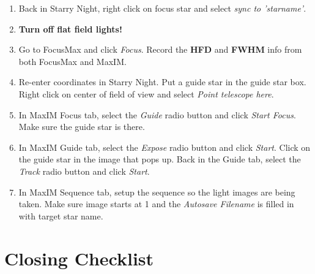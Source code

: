 \documentclass[11pt]{report}
\begin{document}
\begin{enumerate}
\item Back in Starry Night, right click on focus star and select \emph{sync to 'starname'}.
\item {\bf Turn off flat field lights!}
\item Go to FocusMax and click \emph{Focus}. Record the {\bf HFD} and {\bf FWHM} info from both FocusMax and MaxIM.
\item Re-enter coordinates in Starry Night. Put a guide star in the guide star box. Right click on center of field of view and select \emph{Point telescope here}.
\item In MaxIM Focus tab, select the \emph{Guide} radio button and click \emph{Start Focus}. Make sure the guide star is there.
\item In MaxIM Guide tab, select the \emph{Expose} radio button and click \emph{Start}. Click on the guide star in the image that pops up. Back in the Guide tab, select the \emph{Track} radio button and click \emph{Start}.
\item In MaxIM Sequence tab, setup the sequence so the light images are being taken. Make sure image starts at 1 and the \emph{Autosave Filename} is filled in with target star name.
\end{enumerate}

\chapter{Closing Checklist}
\end{document}
